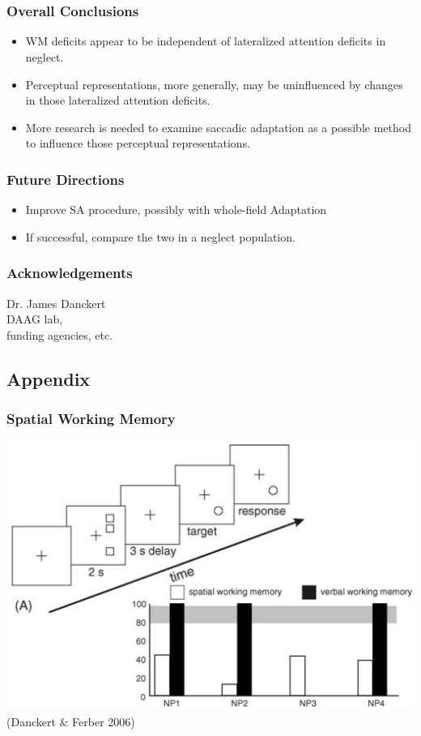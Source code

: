 \documentclass{beamer}
\begin{document}
\section*{}
\begin{frame}
	\frametitle{Overall Conclusions}
	\begin{itemize}
		\item WM deficits appear to be independent of lateralized attention deficits in neglect.
		\item Perceptual representations, more generally, may be uninfluenced by changes in those lateralized attention deficits.
		\item More research is needed to examine saccadic adaptation as a possible method to influence those perceptual representations.
	\end{itemize}
\end{frame}

\begin{frame}
	\frametitle{Future Directions}
	\begin{itemize}
		\item Improve SA procedure, possibly with whole-field Adaptation
		\item If successful, compare the two in a neglect population.
	\end{itemize}
\end{frame}

\begin{frame}
	\frametitle{Acknowledgements}
	Dr. James Danckert\\
	DAAG lab,\\
	funding agencies, etc.
\end{frame}


\subsection*{Appendix}

\end{document}
